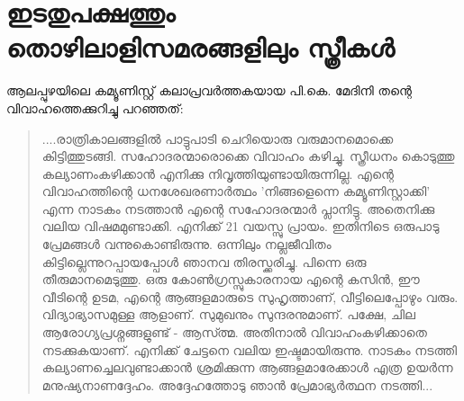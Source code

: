 \section{ഇടതുപക്ഷത്തും തൊഴിലാളിസമരങ്ങളിലും സ്ത്രീകൾ}
\label{11.4}
\label{ch11box13} %
\begin{tcolorbox}[%
 breakable, %
  arc=0mm, 
  left=1pt, right = 1pt, 
  boxrule=0mm,
  colback = {blue!10}, %
] 

ആലപ്പുഴയിലെ കമ്യൂണിസ്റ്റ് കലാപ്രവർത്തകയായ പി.കെ. മേദിനി തന്റെ വിവാഹത്തെക്കുറിച്ചു പറഞ്ഞത്:

\begin{quotation}


....രാത്രികാലങ്ങളിൽ പാട്ടുപാടി ചെറിയൊരു വരുമാനമൊക്കെ കിട്ടിത്തുടങ്ങി. സഹോദരന്മാരൊക്കെ വിവാഹം കഴിച്ചു. സ്ത്രീധനം കൊടുത്തു കല്യാണംകഴിക്കാൻ എനിക്കു നിവൃത്തിയുണ്ടായിരുന്നില്ല. എന്റെ വിവാഹത്തിന്റെ ധനശേഖരണാർത്ഥം 'നിങ്ങളെന്നെ കമ്യൂണിസ്റ്റാക്കി' എന്ന നാടകം നടത്താൻ എന്റെ സഹോദരന്മാർ പ്ലാനിട്ടു. അതെനിക്കു വലിയ വിഷമമുണ്ടാക്കി. എനിക്ക് 21 വയസ്സു പ്രായം. ഇതിനിടെ ഒരുപാടു പ്രേമങ്ങൾ വന്നുകൊണ്ടിരുന്നു. ഒന്നിലും നല്ലജീവിതം കിട്ടില്ലെന്നുറപ്പായപ്പോൾ ഞാനവ തിരസ്ക്കരിച്ചു. പിന്നെ ഒരു തീരുമാനമെടുത്തു. ഒരു കോൺഗ്രസ്സുകാരനായ എന്റെ കസിൻ, ഈ വീടിന്റെ ഉടമ, എന്റെ ആങ്ങളമാരുടെ സുഹൃത്താണ്, വീട്ടിലെപ്പോഴും വരും. വിദ്യാഭ്യാസമുള്ള ആളാണ്. സുമുഖനും സുന്ദരനുമാണ്. പക്ഷേ, ചില ആരോഗ്യപ്രശ്നങ്ങളുണ്ട് - ആസ്ത്മ. അതിനാൽ വിവാഹംകഴിക്കാതെ നടക്കുകയാണ്. എനിക്ക് ചേട്ടനെ വലിയ ഇഷ്ടമായിരുന്നു. നാടകം നടത്തി കല്യാണച്ചെലവുണ്ടാക്കാൻ ശ്രമിക്കുന്ന ആങ്ങളമാരേക്കാൾ എത്ര ഉയർന്ന മനുഷ്യനാണദ്ദേഹം. അദ്ദേഹത്തോടു ഞാൻ പ്രേമാഭ്യർത്ഥന നടത്തി...
\end{quotation}
\end{tcolorbox}
